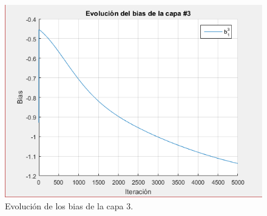 \begin{figure}[H]
    \begin{center}
        \includegraphics[width=12cm]{4/bias3.png}
        \caption{Evolución de los bias de la capa 3.}
        \label{fig:bias10}
    \end{center}
\end{figure}

